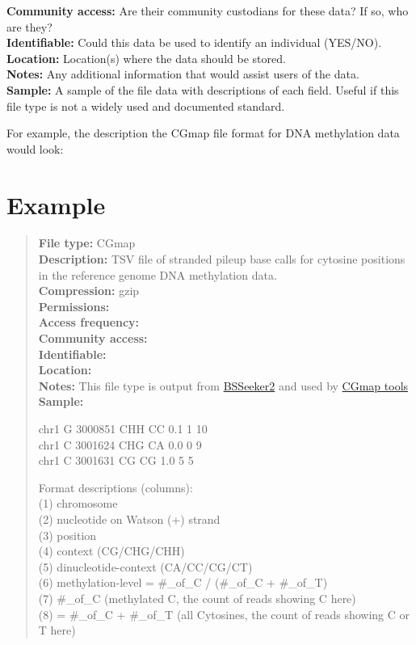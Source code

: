 \documentclass[
]{book}
\begin{document}
\textbf{Community access:} Are their community custodians for these data? If so, who are they?\\

\textbf{Identifiable:} Could this data be used to identify an individual (YES/NO).\\

\textbf{Location:} Location(s) where the data should be stored.\\

\textbf{Notes:} Any additional information that would assist users of the data.\\

\textbf{Sample:} A sample of the file data with descriptions of each field. Useful if this file type is not a widely used and documented standard.

For example, the description the CGmap file format for DNA methylation data would look:

\hypertarget{example}{%
\section{Example}\label{example}}

\begin{quote}
\textbf{File type:} CGmap\\
\textbf{Description:} TSV file of stranded pileup base calls for cytosine positions in the reference genome DNA methylation data.\\
\textbf{Compression:} gzip\\
\textbf{Permissions:}\\
\textbf{Access frequency:}\\
\textbf{Community access:}\\
\textbf{Identifiable:}\\
\textbf{Location:}\\
\textbf{Notes:} This file type is output from \href{https://github.com/BSSeeker/BSseeker2}{BSSeeker2} and used by \href{https://cgmaptools.github.io/}{CGmap tools}\\
\textbf{Sample:}

chr1 G 3000851 CHH CC 0.1 1 10\\
chr1 C 3001624 CHG CA 0.0 0 9\\
chr1 C 3001631 CG CG 1.0 5 5

Format descriptions (columns):\\
(1) chromosome\\
(2) nucleotide on Watson (+) strand\\
(3) position\\
(4) context (CG/CHG/CHH)\\
(5) dinucleotide-context (CA/CC/CG/CT)\\
(6) methylation-level = \#\_of\_C / (\#\_of\_C + \#\_of\_T)\\
(7) \#\_of\_C (methylated C, the count of reads showing C here)\\
(8) = \#\_of\_C + \#\_of\_T (all Cytosines, the count of reads showing C or T here)
\end{quote}
\end{document}
